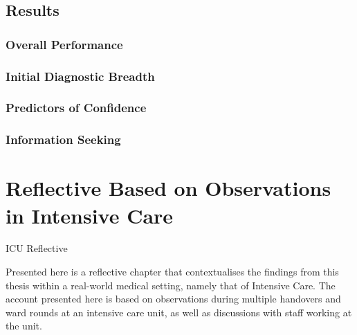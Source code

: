 \documentclass[a4paper, nobind]{templates/ociamthesis}
\begin{document}
\section*{Results}\label{results-2}

\subsection*{Overall Performance}\label{overall-performance-1}

\subsection*{Initial Diagnostic Breadth}\label{initial-diagnostic-breadth}

\subsection*{Predictors of Confidence}\label{predictors-of-confidence}

\subsection*{Information Seeking}\label{information-seeking-2}

\chapter*{Reflective Based on Observations in Intensive Care}\label{reflective-based-on-observations-in-intensive-care}

\adjustmtc
{}

ICU Reflective

Presented here is a reflective chapter that contextualises the findings from this thesis within a real-world medical setting, namely that of Intensive Care. The account presented here is based on observations during multiple handovers and ward rounds at an intensive care unit, as well as discussions with staff working at the unit.
\end{document}
